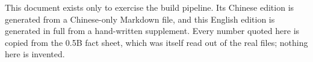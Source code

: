 This document exists only to exercise the build pipeline. Its Chinese edition is generated
from a Chinese-only Markdown file, and this English edition is generated in full from a
hand-written supplement. Every number quoted here is copied from the 0.5B fact sheet, which
was itself read out of the real  files; nothing here is invented.

\clearpage

\renewcommand{\contentsname}{Contents}
\tableofcontents

\clearpage
